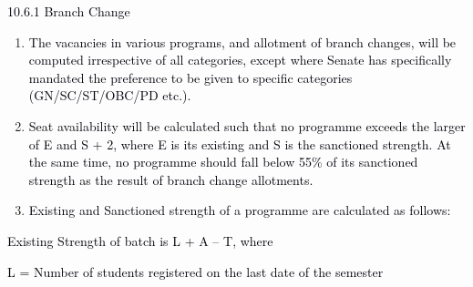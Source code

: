 \documentclass[12pt]{article}
\begin{document}
\vspace{\baselineskip}
{\fontsize{10pt}{12.0pt}\selectfont \textcolor[HTML]{00000A}{10.6.1 Branch Change}\par}\par


\vspace{\baselineskip}
\begin{enumerate}
	\item {\fontsize{10pt}{12.0pt}\selectfont \textcolor[HTML]{00000A}{The vacancies in various programs, and allotment of branch changes, will be computed irrespective of all categories, except where Senate has specifically mandated the preference to be given to specific categories (GN/SC/ST/OBC/PD etc.).}\par}\par


\vspace{\baselineskip}
	\item {\fontsize{10pt}{12.0pt}\selectfont \textcolor[HTML]{00000A}{Seat availability will be calculated such that no programme exceeds the larger of E and S + 2, where E is its existing and S is the sanctioned strength. At the same time, no programme should fall below 55$\%$  of its sanctioned strength as the result of branch change allotments.}\par}\par


\vspace{\baselineskip}
	\item {\fontsize{10pt}{12.0pt}\selectfont \textcolor[HTML]{00000A}{Existing and Sanctioned strength of a programme are calculated as follows:}\par}
\end{enumerate}\par


\vspace{\baselineskip}
\begin{adjustwidth}{0.5in}{0.0in}
{\fontsize{10pt}{12.0pt}\selectfont \textcolor[HTML]{00000A}{Existing Strength of batch is L + A – T, where}\par}\par

\end{adjustwidth}


\vspace{\baselineskip}
\begin{adjustwidth}{1.0in}{0.0in}
{\fontsize{10pt}{12.0pt}\selectfont \textcolor[HTML]{00000A}{L = Number of students registered on the last date of the semester}\par}\par

\end{adjustwidth}
\end{document}
